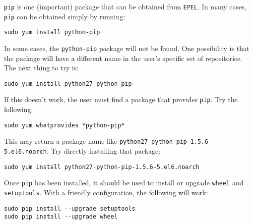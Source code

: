 \verb|pip| is one (important) package that can be obtained from \verb|EPEL|.
In many cases, \verb|pip| can be obtained simply by running:
\begin{lstlisting}
sudo yum install python-pip
\end{lstlisting}
In some cases, the \verb|python-pip| package will not be found.
One possibility is that the package will have a different name
in the user's specific set of repositories.
The next thing to try is:
\begin{lstlisting}
sudo yum install python27-python-pip
\end{lstlisting}
If this doesn't work, 
the user must find a package that provides \verb|pip|.
Try the following:
\begin{lstlisting}
sudo yum whatprovides *python-pip*
\end{lstlisting}
This may return a package name like \newline 
\verb|python27-python-pip-1.5.6-5.el6.noarch|.
Try directly installing that package:
\begin{lstlisting}
sudo yum install python27-python-pip-1.5.6-5.el6.noarch
\end{lstlisting}

Once \verb|pip| has been installed, it should be used 
to install or upgrade \verb|wheel| and \verb|setuptools|.
With a friendly configuration, the following will work:
\begin{lstlisting}
sudo pip install --upgrade setuptools 
sudo pip install --upgrade wheel 
\end{lstlisting}

